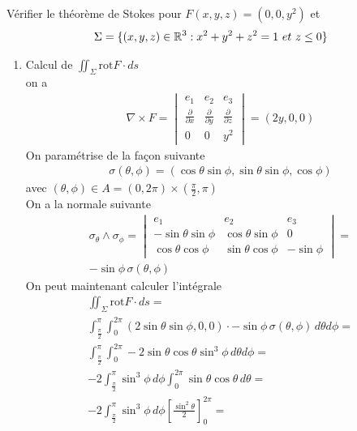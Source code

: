 \begin{myExample}
Vérifier le théorème de Stokes pour $F(x,y,z)=(0,0,y^2)$ et
	\begin{eqnarray*}
		\Sigma=\{(x,y,z)\in\mathbb{R}^3:x^2+y^2+z^2=1\,\,et\,\,z\leq 0\}
	\end{eqnarray*}
	\begin{enumerate}
		\item 
			Calcul de $\iint_\Sigma\mathrm{rot}F\cdot ds$
			\\
			on a
			\begin{eqnarray*}
				\nabla\times F = 
				\begin{vmatrix}
					e_1&e_2&e_3
					\\
					\frac{\partial}{\partial x}&\frac{\partial}{\partial y}&\frac{\partial}{\partial z}
					\\
					0&0&y^2
				\end{vmatrix}=
				(2y,0,0)
			\end{eqnarray*}
			On paramétrise de la façon suivante
			\begin{eqnarray*}
				\sigma(\theta,\phi)=(\cos\theta\sin\phi,\sin\theta\sin\phi,\cos\phi)
			\end{eqnarray*}
			avec $(\theta,\phi)\in A=(0,2\pi)\times(\frac{\pi}{2},\pi)$
			\\On a la normale suivante
			\begin{eqnarray*}
				\sigma_\theta\wedge\sigma_\phi=
				\begin{vmatrix}
					e_1&e_2&e_3
					\\
					-\sin\theta\sin\phi&\cos\theta\sin\phi&0
					\\
					\cos\theta\cos\phi&\sin\theta\cos\phi&-\sin\phi
				\end{vmatrix}=
				\\
				-\sin\phi\,\sigma(\theta,\phi)
			\end{eqnarray*}
			On peut maintenant calculer l'intégrale
			\begin{eqnarray*}
				\iint_\Sigma\mathrm{rot}F\cdot ds=
				\\
				\int_{\frac{\pi}{2}}^\pi\int_{0}^{2\pi}(2\sin\theta\sin\phi,0,0)\cdot-\sin\phi\,\sigma(\theta,\phi)\,d\theta d\phi=
				\\
				\int_{\frac{\pi}{2}}^\pi\int_{0}^{2\pi}-2\sin\theta\cos\theta\sin^3\phi\,d\theta d\phi=
				\\
				-2\int_{\frac{\pi}{2}}^\pi\sin^3\phi\,d\phi\int_{0}^{2\pi}\sin\theta\cos\theta\,d\theta=
				\\
				-2\int_{\frac{\pi}{2}}^\pi\sin^3\phi\,d\phi\left[\frac{\sin^2\theta}{2}\right]_{0}^{2\pi}=

\end{eqnarray*}
\end{enumerate}
\end{myExample}

